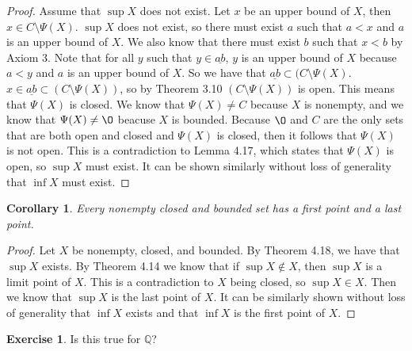 \documentclass[12pt]{article}
\renewcommand{\emptyset}{\O}
\renewcommand{\_}[1]{\underline{ #1 }}
\newtheorem{corollary}[theorem]{Corollary}
\theoremstyle{definition}
\newtheorem{exercise}[theorem]{Exercise}
\numberwithin{equation}{subsection}
\begin{document}
\begin{proof}
Assume that $\sup X$ does not exist. Let $x$ be an upper bound of $X$, then $x \in C \setminus \Psi(X)$. $\sup X$ does not exist, so there must exist $a$ such that $a < x$ and $a$ is an upper bound of $X$. We also know that there must exist $b$ such that $x < b$ by Axiom 3. Note that for all $y$ such that $y \in \_{ab}$, $y$ is an upper bound of $X$ because $a < y$ and $a$ is an upper bound of $X$. So we have that $\_{ab} \subset (C \setminus \Psi(X)$. $x \in \_{ab} \subset (C \setminus \Psi(X))$, so by Theorem 3.10 $(C \setminus \Psi(X))$ is open. This means that $\Psi(X)$ is closed. We know that $\Psi(X) \not = C$ because $X$ is nonempty, and we know that $\Psi(X) \not = \emptyset$ beacuse $X$ is bounded. Because $\emptyset$ and $C$ are the only sets that are both open and closed and $\Psi(X)$ is closed, then it follows that $\Psi(X)$ is not open. This is a contradiction to Lemma 4.17, which states that $\Psi(X)$ is open, so $\sup X$ must exist. It can be shown similarly without loss of generality that $\inf X$ must exist. 
\end{proof}

\begin{corollary}  Every nonempty closed and bounded set has a first point and a last point.
\end{corollary}

\begin{proof}
Let $X$ be nonempty, closed, and bounded. By Theorem 4.18, we have that $\sup X$ exists. By Theorem 4.14 we know that if $\sup X \not \in X$, then $\sup X$ is a limit point of $X$. This is a contradiction to $X$ being closed, so $\sup X \in X$. Then we know that $\sup X$ is the last point of $X$. It can be similarly shown without loss of generality that $\inf X$ exists and that $\inf X$ is the first point of $X$.
\end{proof}

\begin{exercise}  Is this true for $\mathbb{Q}$?
\end{exercise}
\end{document}
